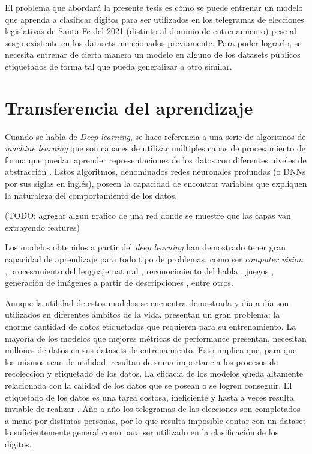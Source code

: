 El problema que abordar\'a la presente tesis es c\'omo se puede entrenar un modelo que aprenda a clasificar d\'igitos
para ser utilizados en los telegramas de elecciones legislativas de Santa Fe del 2021 (distinto al dominio de
entrenamiento) pese al sesgo existente en los datasets mencionados previamente. Para poder lograrlo, se necesita
entrenar de cierta manera un modelo en alguno de los datasets p\'ublicos etiquetados de forma tal que pueda generalizar
a otro similar.

\section{Transferencia del aprendizaje}

Cuando se habla de {\it Deep learning}, se hace referencia a una serie de algoritmos de {\it machine learning} que son
capaces de utilizar m\'ultiples capas de procesamiento de forma que puedan aprender representaciones de los datos con
diferentes niveles de abstracci\'on \parencite{lecun2015deep}. Estos algoritmos, denominados redes neuronales profundas (o DNNs por sus siglas en ingl\'es),
poseen la capacidad de encontrar variables que expliquen la naturaleza del comportamiento de los datos.

(TODO: agregar algun grafico de una red donde se muestre que las capas van extrayendo features)

Los modelos obtenidos a partir del {\it deep learning} han demostrado tener gran capacidad de aprendizaje para todo
tipo de problemas, como ser {\it computer vision} \parencite{szeliski2010computer, redmon2016yolo}, procesamiento del lenguaje natural \parencite{devlin2018bert}, reconocimiento del habla \parencite{hannun2014deep}, juegos \parencite{silver2016mastering}, generaci\'on de im\'agenes a partir de descripciones \parencite{ramesh2022dalle2}, entre otros.

Aunque la utilidad de estos modelos se encuentra demostrada y d\'ia a d\'ia son utilizados en diferentes \'ambitos de
la vida, presentan un gran problema: la enorme cantidad de datos etiquetados que requieren para su entrenamiento. La
mayor\'ia de los modelos que mejores m\'etricas de performance presentan, necesitan millones de datos en sus datasets
de entrenamiento. Esto implica que, para que los mismos sean de utilidad, resultan de suma importancia los procesos de
recolecci\'on y etiquetado de los datos. La eficacia de los modelos queda altamente relacionada con la calidad de los
datos que se posean o se logren conseguir. El etiquetado de los datos es una tarea costosa, ineficiente y hasta a veces
resulta inviable de realizar \parencite{reis2022data}. A\~{n}o a a\~{n}o los telegramas de las elecciones son completados a mano por distintas personas,
por lo que resulta imposible contar con un dataset lo suficientemente general como para ser utilizado en la
clasificaci\'on de los d\'igitos.

